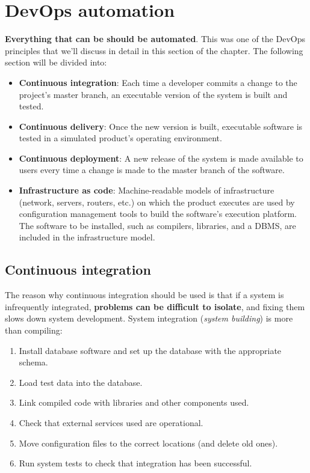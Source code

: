 \newpage

\section{DevOps automation}

\textbf{Everything that can be should be automated}. This was one of the DevOps principles that we'll discuss in detail in this section of the chapter. The following section will be divided into:
\begin{itemize}
    \item \textbf{Continuous integration}: Each time a developer commits a change to the project’s master branch, an executable version of the system is built and tested.
    \item \textbf{Continuous delivery}: Once the new version is built, executable software is tested in a simulated product’s operating environment.
    \item \textbf{Continuous deployment}: A new release of the system is made available to users every time a change is made to the master branch of the software.
    \item \textbf{Infrastructure as code}: Machine-readable models of infrastructure (network, servers, routers, etc.) on which the product executes are used by configuration management tools to build the software’s execution platform. The software to be installed, such as compilers, libraries, and a DBMS, are included in the infrastructure model.
\end{itemize}

\subsection{Continuous integration}

The reason why continuous integration should be used is that if a system is infrequently integrated, \textbf{problems can be difficult to isolate}, and fixing them slows down system development. System integration (\textit{system building}) is more than compiling:
\begin{enumerate}
    \item Install database software and set up the database with the appropriate schema.
    \item Load test data into the database.
    \item Link compiled code with libraries and other components used.
    \item Check that external services used are operational.
    \item Move configuration files to the correct locations (and delete old ones).
    \item Run system tests to check that integration has been successful.
\end{enumerate}

